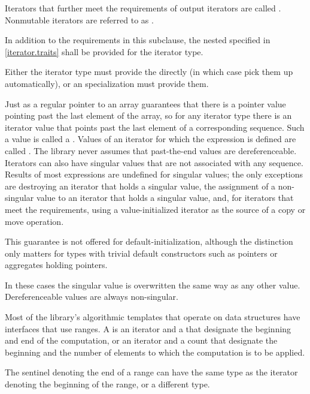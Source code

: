\pnum
Iterators that further meet the requirements of output iterators are
called . Nonmutable iterators are referred to
as .

\pnum
In addition to the requirements in this subclause,
the nested  specified in \ref{iterator.traits}
shall be provided for the iterator type.
\begin{note}
Either the iterator type must provide the  directly
(in which case  pick them up automatically), or
an  specialization must provide them.
\end{note}

\pnum
{}%
%
Just as a regular pointer to an array guarantees that there is a pointer value pointing past the last element
of the array, so for any iterator type there is an iterator value that points past the last element of a
corresponding sequence.
Such a value is called a .
Values of an iterator 
for which the expression  is defined
are called .
The library never assumes that past-the-end values are dereferenceable.
Iterators can also have singular values that are not associated with any
sequence.
Results of most expressions are undefined for singular values;
the only exceptions are destroying an iterator that holds a singular value,
the assignment of a non-singular value to
an iterator that holds a singular value, and, for iterators that meet the
 requirements, using a value-initialized iterator
as the source of a copy or move operation.
\begin{note}
This guarantee is not
offered for default-initialization, although the distinction only matters for types
with trivial default constructors such as pointers or aggregates holding pointers.
\end{note}
In these cases the singular
value is overwritten the same way as any other value.
Dereferenceable
values are always non-singular.

\pnum
Most of the library's algorithmic templates that operate on data structures have
interfaces that use ranges. A  is an iterator and a 
that designate the beginning and end of the computation, or an iterator and a
count that designate the beginning and the number of elements to which the
computation is to be applied.
\begin{footnote}
The sentinel denoting the end of a range
can have the same type as the iterator denoting the beginning of the range, or a
different type.
\end{footnote}

